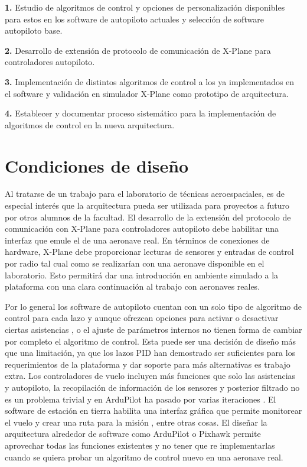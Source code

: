 \textbf{1.} Estudio de algoritmos de control y opciones de personalización disponibles para estos en los software de autopiloto actuales y selección de software autopiloto base.

\textbf{2.} Desarrollo de extensión de protocolo de comunicación de X-Plane para controladores autopiloto.

\textbf{3.} Implementación de distintos algoritmos de control a los ya implementados en el software y validación en simulador X-Plane como prototipo de arquitectura.

\textbf{4.} Establecer y documentar proceso sistemático para la implementación de algoritmos de control en la nueva arquitectura.

\section{Condiciones de diseño}

Al tratarse de un trabajo para el laboratorio de técnicas aeroespaciales, es de especial interés que la arquitectura pueda ser utilizada para proyectos a futuro por otros alumnos de la facultad. El desarrollo de la extensión del protocolo de comunicación con X-Plane para controladores autopiloto debe habilitar una interfaz que emule el de una aeronave real. En términos de conexiones de hardware, X-Plane debe proporcionar lecturas de sensores y entradas de control por radio tal cual como se realizarían con una aeronave disponible en el laboratorio. Esto permitirá dar una introducción en ambiente simulado a la plataforma con una clara continuación al trabajo con aeronaves reales.

Por lo general los software de autopiloto cuentan con un solo tipo de algoritmo de control para cada lazo y aunque ofrezcan opciones para activar o desactivar ciertas asistencias \cite{ardupilot-flight-modes}, o el ajuste de parámetros internos \cite{ardupilot-plane-tuning} no tienen forma de cambiar por completo el algoritmo de control. Esta puede ser una decisión de diseño más que una limitación, ya que los lazos PID han demostrado ser suficientes para los requerimientos de la plataforma y dar soporte para más alternativas es trabajo extra. Los controladores de vuelo incluyen más funciones que solo las asistencias y autopiloto, la recopilación de información de los sensores y posterior filtrado no es un problema trivial y en ArduPilot ha pasado por varias iteraciones \cite{ardupilot-ekf}. El software de estación en tierra habilita una interfaz gráfica que permite monitorear el vuelo y crear una ruta para la misión \cite{ardupilot-gs}, entre otras cosas. El diseñar la arquitectura alrededor de software como ArduPilot o Pixhawk permite aprovechar todas las funciones existentes y no tener que re implementarlas cuando se quiera probar un algoritmo de control nuevo en una aeronave real.


